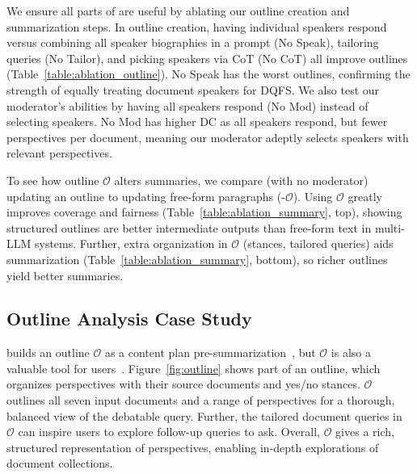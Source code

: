 We ensure all parts of \model are useful by ablating our outline creation and summarization steps.
In outline creation, having individual speakers respond versus combining all speaker biographies in a prompt (No Speak), tailoring queries (No Tailor), and picking speakers via CoT (No CoT) all improve outlines (Table~\ref{table:ablation_outline}).
No Speak has the worst outlines, confirming the strength of equally treating document speakers for DQFS.
We also test our moderator's abilities by having all speakers respond (No Mod) instead of selecting speakers.
No Mod has higher DC as all speakers respond, but fewer perspectives per document, meaning our moderator adeptly selects speakers with relevant perspectives.

To see how outline $\mathcal{O}$ alters summaries, we compare \model (with no moderator) updating an outline to updating free-form paragraphs (-$\mathcal{O}$). 
Using $\mathcal{O}$ greatly improves coverage and fairness (Table~\ref{table:ablation_summary}, top), showing structured outlines are better intermediate outputs than free-form text in multi-LLM systems.
Further, extra organization in $\mathcal{O}$ (stances, tailored queries) aids summarization (Table~\ref{table:ablation_summary}, bottom), so richer outlines yield better summaries.




%



\subsection{Outline Analysis Case Study} \label{subsection:qg}

\model builds an outline $\mathcal{O}$ as a content plan pre-summarization~\cite{shao2024assisting}, but $\mathcal{O}$ is also a valuable tool for users~\cite{barrow2021syntopical}.
Figure~\ref{fig:outline} shows part of an outline, which organizes perspectives with their source documents and yes/no stances.
$\mathcal{O}$ outlines all seven input documents and a range of perspectives for a thorough, balanced view of the debatable query.
Further, the tailored document queries in $\mathcal{O}$ can inspire users to explore follow-up queries to ask.
Overall, $\mathcal{O}$ gives a rich, structured representation of perspectives, enabling in-depth explorations of document collections.